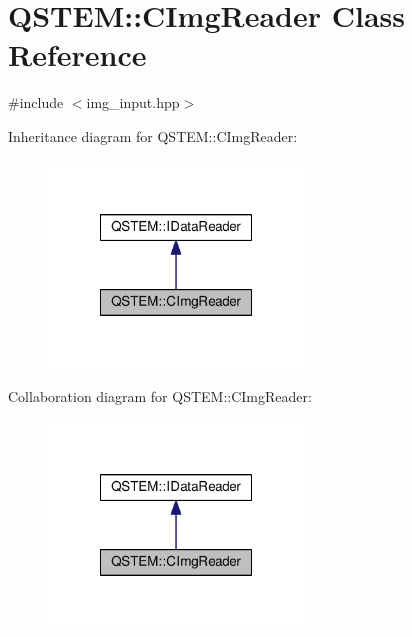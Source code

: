 \hypertarget{class_q_s_t_e_m_1_1_c_img_reader}{\section{Q\-S\-T\-E\-M\-:\-:C\-Img\-Reader Class Reference}
\label{class_q_s_t_e_m_1_1_c_img_reader}
}


{\ttfamily \#include $<$img\-\_\-input.\-hpp$>$}



Inheritance diagram for Q\-S\-T\-E\-M\-:\-:C\-Img\-Reader\-:
\nopagebreak
\begin{figure}[H]
\begin{center}
\leavevmode
\includegraphics[width=192pt]{class_q_s_t_e_m_1_1_c_img_reader__inherit__graph}
\end{center}
\end{figure}


Collaboration diagram for Q\-S\-T\-E\-M\-:\-:C\-Img\-Reader\-:
\nopagebreak
\begin{figure}[H]
\begin{center}
\leavevmode
\includegraphics[width=192pt]{class_q_s_t_e_m_1_1_c_img_reader__coll__graph}
\end{center}
\end{figure}
